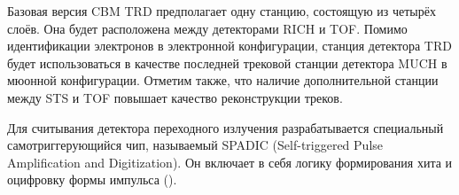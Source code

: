 
Базовая версия CBM TRD предполагает одну станцию, состоящую из четырёх слоёв. Она будет расположена между детекторами RICH и TOF. Помимо идентификации электронов в электронной конфигурации, станция детектора TRD будет использоваться в качестве последней трековой станции детектора MUCH в мюонной конфигурации. Отметим также, что наличие дополнительной станции между STS и TOF повышает качество реконструкции треков.


Для считывания детектора переходного излучения разрабатывается специальный самотриггерующийся чип, называемый SPADIC (Self-triggered Pulse Amplification and Digitization). Он включает в себя логику формирования хита и оцифровку формы импульса (\cite{SPADIC}).

